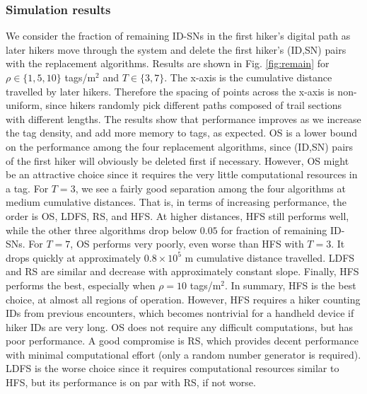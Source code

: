\documentclass[conference]{IEEEtran}
\begin{document}
\subsubsection{Simulation results}
We consider the fraction of remaining ID-SNs in the first hiker's digital path as later hikers move through the system and delete the first hiker's (ID,SN) pairs with the replacement algorithms.  Results are shown in Fig. \ref{fig:remain} for $\rho \in \{1, 5, 10\}$ tags/m$^2$ and $T \in \{3, 7\}$.  The x-axis is the cumulative distance travelled by later hikers.  Therefore the spacing of points across the x-axis is non-uniform, since hikers randomly pick different paths composed of trail sections with different lengths.  The results show that performance improves as we increase the tag density, and add more memory to tags, as expected.  OS is a lower bound on the performance among the four replacement algorithms, since (ID,SN) pairs of the first hiker will obviously be deleted first if necessary.  However, OS might be an attractive choice since it requires the very little computational resources in a tag.  For $T=3$, we see a fairly good separation among the four algorithms at medium cumulative distances.  That is, in terms of increasing performance, the order is OS, LDFS, RS, and HFS.  At higher distances, HFS still performs well, while the other three algorithms drop below $0.05$ for fraction of remaining ID-SNs.  For $T=7$, OS performs very poorly, even worse than HFS with $T=3$.  It drops quickly at approximately $0.8 \times 10^5$ m cumulative distance travelled.  LDFS and RS are similar  and decrease with approximately constant slope.  Finally, HFS performs the best, especially when $\rho = 10$ tags/m$^2$.  In summary, HFS is the best choice, at almost all regions of operation.  However, HFS requires a hiker counting IDs from previous encounters, which becomes nontrivial for a handheld device if hiker IDs are very long.  OS does not require any difficult computations, but has poor performance.  A good compromise is RS, which provides decent performance with minimal computational effort (only a random number generator is required).  LDFS is the worse choice since it requires computational resources similar to HFS, but its performance is on par with RS, if not worse.
\end{document}
